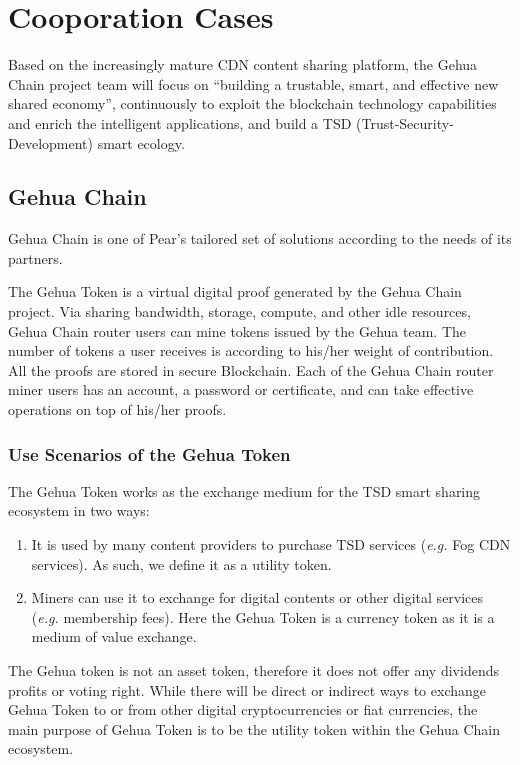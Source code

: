 \chapter{Cooporation Cases}\label{chp-cooporation-cases}
Based on the increasingly mature CDN content sharing platform, the Gehua Chain project team will focus on ``building a trustable, smart, and effective new shared economy'', continuously to exploit the blockchain technology capabilities and enrich the intelligent applications, and build a TSD  (Trust-Security-Development) smart ecology.

\section{Gehua Chain}
Gehua Chain is one of Pear's tailored set of solutions according to the needs of its partners. 

The Gehua Token is a virtual digital proof generated by the Gehua Chain project. Via sharing bandwidth, storage, compute, and other idle resources, Gehua Chain router users can mine tokens issued by the Gehua team. The number of tokens a user receives is according to his/her weight of contribution. 
All the proofs are stored in secure Blockchain. Each of the Gehua Chain router miner users has an account, a password or certificate, and can take effective operations on top of his/her proofs.

\subsection{Use Scenarios of the Gehua Token}
The Gehua Token works as the exchange medium for the TSD smart sharing ecosystem in two ways: 
\begin{enumerate}
	\item It is used by many content providers to purchase TSD services ({\em e.g.} Fog CDN services). As such, we define it as a utility token. 
	\item Miners can use it to exchange for digital contents or other digital services ({\em e.g.} membership fees). Here the Gehua Token is a currency token as it is a medium of value exchange. 
\end{enumerate}
The Gehua token is not an asset token, therefore it does not offer any dividends profits or voting right. While there will be direct or indirect ways to exchange Gehua Token to or from other digital cryptocurrencies or fiat currencies, the main purpose of Gehua Token is to be the utility token within the Gehua Chain ecosystem. 

